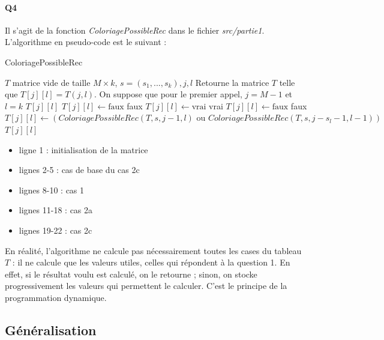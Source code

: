 \documentclass[12pt]{article}
\newcommand{\true}{\text{vrai}}
\newcommand{\false}{\text{faux}}
\begin{document}
			\paragraph{Q4}
				Il s'agit de la fonction \textit{ColoriagePossibleRec} dans le fichier \textit{src/partie1}. L'algorithme en pseudo-code est le suivant :
				\begin{algorithm} [H]
					\caption{ColoriagePossibleRec}
					\label{color_poss_rec}
					\begin{algorithmic}[1]
						\REQUIRE $T$ matrice vide de taille $ M \times k $, $ s=(s_1,...,s_k), j, l$ 
						\ENSURE Retourne la matrice $ T $ telle que $ T[j][l] = T(j,l) $. On suppose que pour le premier appel, $ j = M-1 $ et $ l = k $
						\RETURN $ T[j][l] $
						\STATE $ T[j][l] \leftarrow \false $
						\RETURN faux
						\STATE $ T[j][l] \leftarrow \true $
						\RETURN vrai
						\ELSE
						\STATE$ T[j][l] \leftarrow \false $
						\RETURN faux
						\ENDIF
						\ELSE
						\STATE $ T[j][l] \leftarrow (ColoriagePossibleRec(T,s,j-1,l) \text{ ou } ColoriagePossibleRec(T,s,j-s_l-1,l-1)) $
						\RETURN $ T[j][l] $
						\ENDIF\begin{flushleft}
							
						\end{flushleft}
					\end{algorithmic}
				\end{algorithm}
				
				\begin{itemize}
					\item ligne 1 : initialisation de la matrice
					\item lignes 2-5 : cas de base du cas 2c
					\item lignes 8-10 : cas 1
					\item lignes 11-18 : cas 2a
					\item lignes 19-22 : cas 2c
				\end{itemize}
				
				En réalité, l'algorithme ne calcule pas nécessairement toutes les cases du tableau $ T $ : il ne calcule que les valeurs utiles, celles qui répondent à la question 1. En effet, si le résultat voulu est calculé, on le retourne ; sinon, on stocke progressivement les valeurs qui permettent le calculer. C'est le principe de la programmation dynamique.
	
		\subsection{Généralisation}
		
\end{document}
